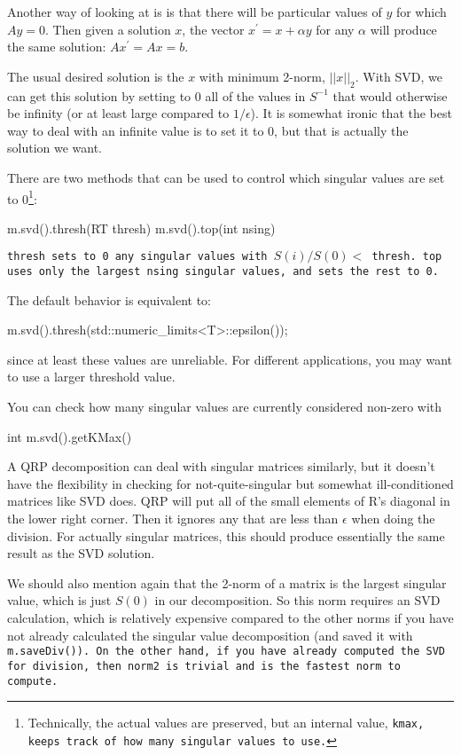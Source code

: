 Another way of looking at is is that there will be particular values of $y$ 
for which $A y = 0$.
Then given a solution $x$, the vector $x^\prime = x + \alpha y$ for any $\alpha$
will produce 
the same solution: $A x^\prime = A x = b$.

The usual desired solution is the $x$ with minimum 2-norm, $||x||_2$.
With SVD, we can get this solution by setting to 0 all of the values
in $S^{-1}$ that would otherwise be infinity (or at least large compared
to $1/\epsilon$).  It is somewhat ironic that the best way to deal with 
an infinite value is to set it to 0, but that is actually the solution we want.

There are two methods that can be used to control which 
singular values are set to 0\footnote{Technically, the actual values are preserved,
but an internal value, \tt{kmax}, keeps track of how many singular values to use.}:
\begin{tmvcode}
m.svd().thresh(RT thresh)
m.svd().top(int nsing)
\end{tmvcode}
\tt{thresh} sets to 0 any singular values with $S(i)/S(0) <$ \tt{thresh}.
\tt{top} uses only the largest \tt{nsing} singular values, and sets the rest to 0.

The default behavior is equivalent to:
\begin{tmvcode}
m.svd().thresh(std::numeric_limits<T>::epsilon());
\end{tmvcode}
since at least these values are unreliable.  For different applications,
you may want to use a larger threshold value.

You can check how many singular values are currently considered non-zero with
\begin{tmvcode}
int m.svd().getKMax()
\end{tmvcode}

A QRP decomposition can deal with singular matrices similarly,
but it doesn't have the flexibility in checking for not-quite-singular
but somewhat ill-conditioned matrices like SVD does.
QRP will put all of the small elements of R's diagonal in the 
lower right corner.  Then it ignores any that are less than 
$\epsilon$ when doing the division.  For actually singular matrices,
this should produce essentially the same result as the SVD solution.

We should also mention again that the 2-norm of a matrix is the 
largest singular value, which is just $S(0)$ in our decomposition.
So this norm requires an SVD calculation, 
which is relatively expensive compared to the other norms
if you have not already calculated the singular value decomposition
(and saved it with \tt{m.saveDiv()}).  On the other hand, if you have already
computed the SVD for division, then \tt{norm2} is trivial and is the 
fastest norm to compute.

